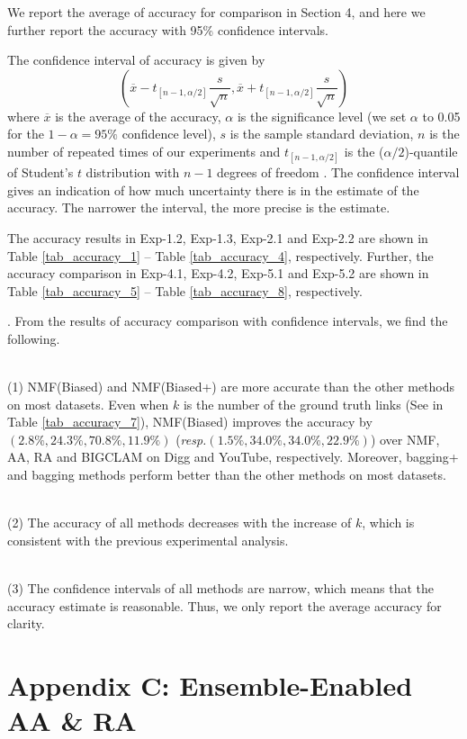 \documentclass[10pt,journal,compsoc]{IEEEtran}
\newcommand{\stitle}[1]{\vspace{0.5ex}\noindent{\bf #1}}
\newcommand{\NMF}{{\sf NMF}\xspace }
\newcommand{\Biased}{{\sf NMF(Biased)}\xspace}
\newcommand{\Aa}{{\sf AA}\xspace }
\newcommand{\RA}{{\sf RA}\xspace }
\newcommand{\BIGCLAM}{{\sf BIGCLAM}\xspace}
\newcommand{\Digg}{{\sf Digg}\xspace}
\newcommand{\YouTube}{{\sf YouTube}\xspace}
\newcommand{\Biasedp}{{\sf NMF(Biased+)}\xspace}
\newcommand{\resp}{\emph{resp.}\xspace}
\newcommand{\sstab}{\rule{0pt}{8pt}\\[-2.4ex]}
\begin{document}
We report the average of accuracy for comparison in Section 4, and here
we further report the accuracy with 95\% confidence
intervals.

The confidence interval of accuracy is given by
\[ (\overline{x} - t_{[n-1,\alpha/2]}\frac{s}{\sqrt{n}}, \overline{x} + t_{[n-1,\alpha/2]}\frac{s}{\sqrt{n}})  \]
where $\overline{x}$ is the average of the accuracy, $\alpha$ is the significance level
(we set $\alpha$ to 0.05 for the $1 - \alpha = 95\%$ confidence level),
$s$ is the sample standard deviation, $n$ is the number of repeated
times of our experiments and $t_{[n-1,\alpha/2]}$ is the ($\alpha/2$)-quantile
of Student's $t$ distribution with $n - 1$ degrees of freedom \cite{stati}.
The confidence interval gives an indication of how much uncertainty there is in
the estimate of the accuracy. The narrower the interval, the more precise is the estimate.

The accuracy results in Exp-1.2, Exp-1.3, Exp-2.1 and Exp-2.2 are shown in
Table \ref{tab_accuracy_1} -- Table \ref{tab_accuracy_4}, respectively.
Further, the accuracy comparison in Exp-4.1, Exp-4.2, Exp-5.1 and Exp-5.2 are shown in
Table \ref{tab_accuracy_5} -- Table \ref{tab_accuracy_8}, respectively.


\stitle{Remarks}. From the results of accuracy comparison with confidence intervals,
we find the following.

\sstab (1) \Biased and \Biasedp are more accurate than the other methods
on most datasets. Even when $k$ is the number of the ground truth links (See in Table \ref{tab_accuracy_7}), \Biased improves
the accuracy by $(2.8\%, 24.3\%, 70.8\%, 11.9\%)$ (\resp $(1.5\%, 34.0\%, 34.0\%, 22.9\%)$)
over \NMF, \Aa, \RA and \BIGCLAM on \Digg and \YouTube, respectively.
Moreover, bagging+ and bagging methods perform better than the other methods on most datasets.

\sstab (2) The accuracy of all methods decreases with the increase of $k$,
which is consistent with the previous experimental analysis.

\sstab (3) The confidence intervals of all methods are narrow, which means that the accuracy estimate is reasonable.
Thus, we only report the average accuracy for clarity.






\section{Appendix C: Ensemble-Enabled AA \& RA}
\end{document}
